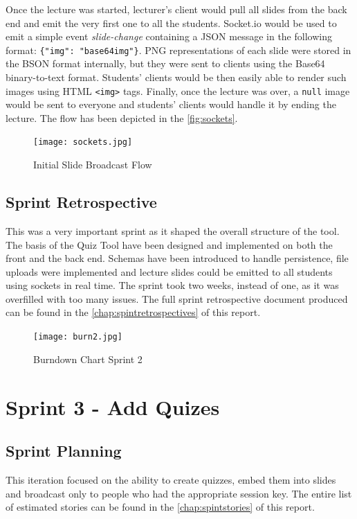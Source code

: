 Once the lecture was started, lecturer's client would pull all slides from the back end and emit the very
first one to all the students. Socket.io would be used to emit a simple event \textit{slide-change} containing
a JSON message in the following format: \texttt{\{"img": "base64img"\}}. PNG representations of each slide
were stored in the BSON format internally, but they were sent to clients using the Base64 binary-to-text format\cite{54}.
Students' clients would be then easily able to render such images using HTML \texttt{<img>} tags. Finally,
once the lecture was over, a \texttt{null} image would be sent to everyone and students' clients would
handle it by ending the lecture. The flow has been depicted in the \autoref{fig:sockets}.

\begin{figure}[h!]
    \centering
    \texttt{[image: sockets.jpg]}
    \caption{Initial Slide Broadcast Flow}
    \label{fig:sockets}
\end{figure}

\newpage
\subsection{Sprint Retrospective}
This was a very important sprint as it shaped the overall structure of the tool. The basis
of the Quiz Tool have been designed and implemented on both the front and the back end.
Schemas have been introduced to handle persistence, file uploads were implemented and
lecture slides could be emitted to all students using sockets in real time. The sprint
took two weeks, instead of one, as it was overfilled with too many issues.
The full sprint retrospective document produced can be found in the \autoref{chap:spintretrospectives} of this report.

\begin{figure}[h!]
    \centering
    \texttt{[image: burn2.jpg]}
    \caption{Burndown Chart Sprint 2}
    \label{fig:burn1}
\end{figure}

\section{Sprint 3 - Add Quizes}
\subsection{Sprint Planning}
This iteration focused on the ability to create quizzes, embed them into slides and
broadcast only to people who had the appropriate session key. The entire list of estimated stories
can be found in the \autoref{chap:spintstories} of this report.

